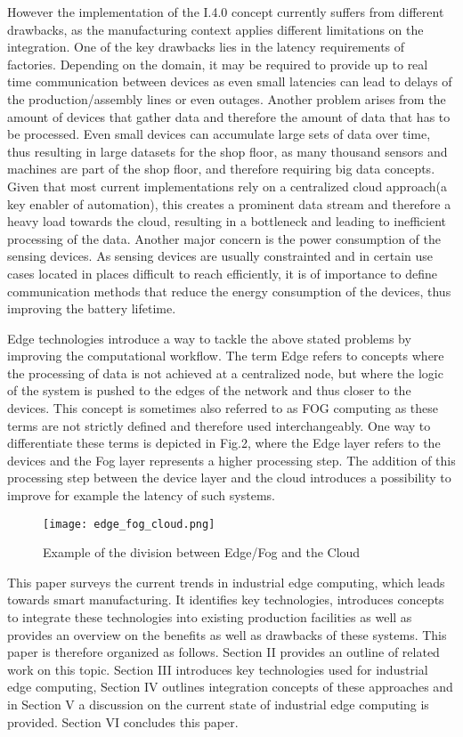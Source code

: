 However the implementation of the I.4.0 concept currently suffers from different drawbacks, as the manufacturing context applies different limitations on the integration. One of the key drawbacks lies in the latency requirements of factories. \cite{latency} Depending on the domain, it may be required to provide up to real time communication between devices as even small latencies can lead to delays of the production/assembly lines or even outages. Another problem arises from the amount of devices that gather data and therefore the amount of data that has to be processed. \cite{bigData} Even small devices can accumulate large sets of data over time, thus resulting in large datasets for the shop floor, as many thousand sensors and machines are part of the shop floor, and therefore requiring big data concepts. Given that most current implementations rely on a centralized cloud approach(a key enabler of automation), this creates a prominent data stream and therefore a heavy load towards the cloud, resulting in a bottleneck and leading to inefficient processing of the data. Another major concern is the power consumption of the sensing devices. \cite{fogDep} As sensing devices are usually constrainted and in certain use cases located in places difficult to reach efficiently, it is of importance to define communication methods that reduce the energy consumption of the devices, thus improving the battery lifetime.

Edge technologies introduce a way to tackle the above stated problems by improving the computational workflow. The term Edge refers to concepts where the processing of data is not achieved at a centralized node, but where the logic of the system is pushed to the edges of the network and thus closer to the devices. \cite{edgeDef} This concept is sometimes also referred to as FOG computing as these terms are not strictly defined and therefore used interchangeably. One way to differentiate these terms is depicted in Fig.2, where the Edge layer refers to the devices and the Fog layer represents a higher processing step. The addition of this processing step between the device layer and the cloud introduces a possibility to improve for example the latency of such systems.

\begin{figure}
	\centering
	\texttt{[image: edge\_fog\_cloud.png]}
	\caption{Example of the division between Edge/Fog and the Cloud}
\end{figure}

This paper surveys the current trends in industrial edge computing, which leads towards smart manufacturing. It identifies key technologies, introduces concepts to integrate these technologies into existing production facilities as well as provides an overview on the benefits as well as drawbacks of these systems. This paper is therefore organized as follows. Section II provides an outline of related work on this topic. Section III introduces key technologies used for industrial edge computing, Section IV outlines integration concepts of these approaches and in Section V a discussion on the current state of industrial edge computing is provided. Section VI concludes this paper.

